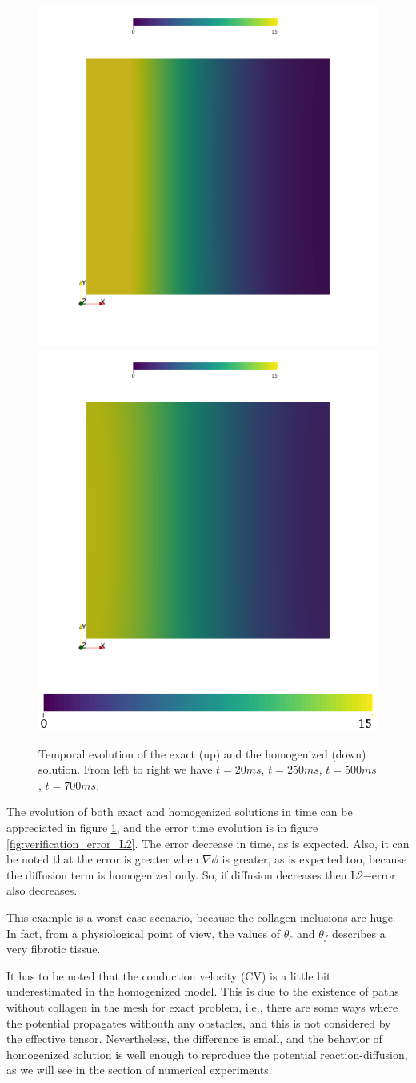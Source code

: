 \begin{figure}[!htb]
	\includegraphics[height = 3 cm, trim = {6cm 6cm 6cm 6cm}, clip]{fig/Verificacion_Teorema/500h}
	\includegraphics[height = 3 cm, trim = {6cm 6cm 6cm 6cm}, clip]{fig/Verificacion_Teorema/700h}\\[0.3 cm]
	
	\includegraphics[height = 0.7 cm]{fig/Verificacion_Teorema/colourbar_diffusion}	
	\caption{Temporal evolution of the exact (up) and the homogenized (down) solution. From left to right we have $t = 20 ms$, $t = 250 ms$, $t = 500 ms$, $t = 700 ms$.} \label{fig:surrogate_ver}
\end{figure}

The evolution of both exact and homogenized solutions in time can be appreciated in figure \ref{fig:surrogate_ver}, and the error time evolution is in figure \ref{fig:verification_error_L2}. The error decrease in time, as is expected. Also, it can be noted that the error is greater when $\nabla \phi$ is greater, as is expected too, because the diffusion term is homogenized only. So, if diffusion decreases then L2$-$error also decreases.

This example is a worst-case-scenario, because the collagen inclusions are huge. In fact, from a physiological point of view, the values of $\theta_c$ and $\theta_f$ describes a very fibrotic tissue.


It has to be noted that the conduction velocity (CV) is a little bit underestimated in the homogenized model. This is due to the existence of paths without collagen in the mesh for exact problem, i.e., there are some ways where the potential propagates withouth any obstacles, and this is not considered by the effective tensor. Nevertheless, the difference is small, and the behavior of homogenized solution is well enough to reproduce the potential reaction-diffusion, as we will see in the section of numerical experiments.

